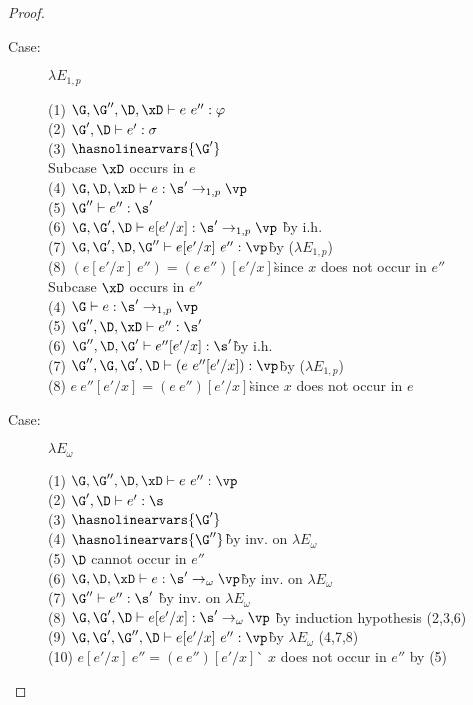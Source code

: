 \begin{proof}
\begin{description}
\item[Case:] $\lambda E_{1,p}$
\begin{tabbing}
    (1) $\G,\G'',\D,\xD \vdash e~e'' : \varphi$\\
    (2) $\G',\D \vdash e' : \sigma$\\
    (3) $\hasnolinearvars{\G'}$\\
    Subcase $\xD$ occurs in $e$\\
    (4) $\G,\D,\xD \vdash e : \s' \to_{1,p} \vp$\\
    (5) $\G'' \vdash e'' : \s'$\\
    (6) $\G,\G',\D\vdash e[e'/x] : \s' \to_{1,p} \vp$ \` by i.h.\\
    (7) $\G,\G',\D,\G'' \vdash e[e'/x]~e'' : \vp$\` by ($\lambda E_{1,p}$)\\
    (8) $(e[e'/x]~e'')=(e~e'')[e'/x]$\` since $x$ does not occur in $e''$\\
    Subcase $\xD$ occurs in $e''$\\
    (4) $\G \vdash e : \s' \to_{1,p} \vp$\\
    (5) $\G'',\D,\xD \vdash e'' : \s'$\\
    (6) $\G'',\D,\G' \vdash e''[e'/x] : \s'$\` by i.h.\\
    (7) $\G'',\G,\G',\D \vdash (e~e''[e'/x]) : \vp$\` by ($\lambda E_{1,p}$)\\
    (8) $e~e''[e'/x] = (e~e'')[e'/x]$\`since $x$ does not occur in $e$\\

\end{tabbing}

\item[Case:] $\lambda E_\omega$
\begin{tabbing}
    (1) $\G, \G'', \D, \xD \vdash e~e'' : \vp$\\
    (2) $\G', \D \vdash e' : \s$\\
    (3) $\hasnolinearvars{\G'}$\\
    (4) $\hasnolinearvars{\G''}$\` by inv. on $\lambda E_\omega$\\
    (5) $\D$ cannot occur in $e''$\\
    (6) $\G, \D, \xD \vdash e : \s' \to_\omega \vp$\` by inv. on $\lambda E_\omega$\\
    (7) $\G'' \vdash e'' : \s'$ \` by inv. on $\lambda E_\omega$\\
    (8) $\G, \G', \D \vdash e[e'/x] : \s' \to_\omega \vp$ \` by induction hypothesis (2,3,6)\\
    (9) $\G, \G', \G'', \D \vdash e[e'/x]~e'' : \vp$\` by $\lambda E_\omega$ (4,7,8)\\
    (10) $e[e'/x]~e'' = (e~e'')[e'/x]$\` $x$ does not occur in $e''$ by (5)\\
\end{tabbing}


\end{description}
\end{proof}
